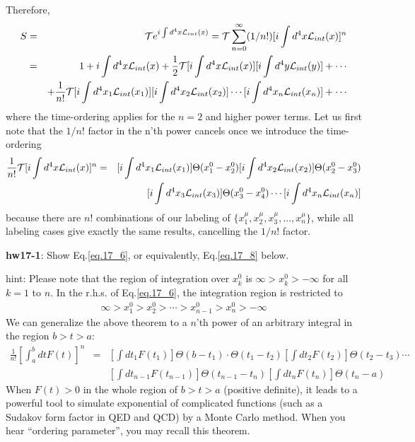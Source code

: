 \documentclass[12pt]{article}
\begin{document}
  Therefore,
\begin{eqnarray}
  S &=& {\cal T} e^{ i\int d^4x {\cal L}_{int}(x) }
       = {\cal T} \sum_{n=0}^\infty (1/n!) [i\int d^4x {\cal L}_{int}(x)]^n \nonumber \\
       &=& 1
       + i\int d^4x {\cal L}_{int}(x)
       + \frac{1}{2} {\cal T} [i\int d^4x {\cal L}_{int}(x)] [i\int d^4y{\cal L}_{int}(y)]
       + \cdots \nonumber \\
       &&+ \frac{1}{n!} {\cal T} [i\int d^4x_1 {\cal L}_{int}(x_1)] [i\int d^4x_2 {\cal L}_{int}(x_2)]
                            \cdots           [i\int d^4x_n {\cal L}_{int}(x_n)]
       + \cdots \label{eq.17_5}
\end{eqnarray}
  where the time-ordering applies for the $n=2$ and higher power terms.
  Let us first note that the $1/n!$ factor in the n'th power cancels once
  we introduce the time-ordering
\begin{eqnarray}
  \frac{1}{n!} {\cal T} [i\int d^4x {\cal L}_{int}(x)]^n  &=& 
  [i\int d^4x_1{\cal L}_{int}(x_1)] \Theta(x_1^0-x_2^0) 
  [i\int d^4x_2 {\cal L}_{int}(x_2)] \Theta(x_2^0-x_3^0) \nonumber \\
  &&[i\int d^4x_3 {\cal L}_{int}(x_3)] \Theta(x_3^0-x_4^0) 
  \cdots 
  [i\int d^4x_n {\cal L}_{int}(x_n)]  \label{eq.17_6}
\end{eqnarray}
 because there are $n!$ combinations of our labeling of
  $\{x_1^\mu, x_2^\mu, x_3^\mu, ..., x_n^\mu\}$, while all labeling cases
  give exactly the same results, cancelling the $1/n!$ factor.

{\bf hw17-1}: Show Eq.\ref{eq.17_6}, or equivalently, Eq.\ref{eq.17_8} below.

hint: Please note that the region of integration over $x_k^0$ is
  $\infty > x_k^0 > -\infty$ for all $k=1$ to $n$. In the r.h.s. of Eq.\ref{eq.17_6}, the integration region is restricted to
\begin{eqnarray}
  \infty > x_1^0 > x_2^0 > \cdots > x_{n-1}^0 > x_n^0 > -\infty \label{eq.17_7}
\end{eqnarray}
  We can generalize the above theorem to a $n$'th power of an arbitrary
  integral in the region $b > t > a$:
\begin{eqnarray}
  \frac{1}{n!} [ \int_a^b dt F(t) ]^n &=& [ \int dt_1 F(t_1)]  \Theta(b-t_1) \cdot \Theta(t_1-t_2)  [ \int dt_2 F(t_2)]  \Theta(t_2-t_3) \cdots \nonumber \\&&  [ \int dt_{n-1} F(t_{n-1})] \Theta(t_{n-1}-t_n)  [ \int dt_n F(t_n)]   \Theta(t_n-a) \label{eq.17_8}
\end{eqnarray}
  When $F(t)>0$ in the whole region of $b>t>a$ (positive definite), it leads
  to a powerful tool to simulate exponential of complicated functions
  (such as a Sudakov form factor in QED and QCD) by a Monte Carlo method.
  When you hear ``ordering parameter'', you may recall this theorem.
\end{document}

